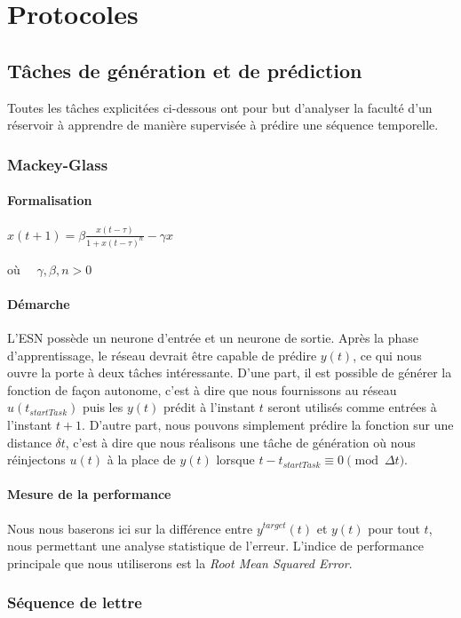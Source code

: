 \documentclass[12pt]{article}
\begin{document}
\section{Protocoles}

\subsection{Tâches de génération et de prédiction}

Toutes les tâches explicitées ci-dessous ont pour but d'analyser la faculté d'un réservoir à apprendre de manière supervisée à prédire une séquence temporelle.

\subsubsection{Mackey-Glass}
\paragraph{Formalisation}
\begin{center}
$x(t+1) = \beta \frac{ x(t-\tau) }{ 1+{x(t-\tau)}^n }-\gamma x$
\end{center}
où $\quad \gamma,\beta,n > 0$
\paragraph{Démarche}
L'ESN possède un neurone d'entrée et un neurone de sortie. Après la phase d'apprentissage, le réseau devrait être capable de prédire $y(t)$, ce qui nous ouvre la porte à deux tâches intéressante. D'une part, il est possible de générer la fonction de façon autonome, c'est à dire que nous fournissons au réseau $u(t_{startTask})$ puis les $y(t)$ prédit à l'instant $t$ seront utilisés comme entrées à l'instant $t+1$. D'autre part, nous pouvons simplement prédire la fonction sur une distance $\delta t$, c'est à dire que nous réalisons une tâche de génération où nous réinjectons $u(t)$ à la place de $y(t)$ lorsque $t - t_{startTask} \equiv 0 \pmod{ \Delta t }$.
\paragraph{Mesure de la performance}
Nous nous baserons ici sur la différence entre $y^{target}(t)$ et $y(t)$ pour tout $t$, nous permettant une analyse statistique de l'erreur. L'indice de performance principale que nous utiliserons est la \textit{Root Mean Squared Error}.


\subsubsection{Séquence de lettre}
\end{document}
